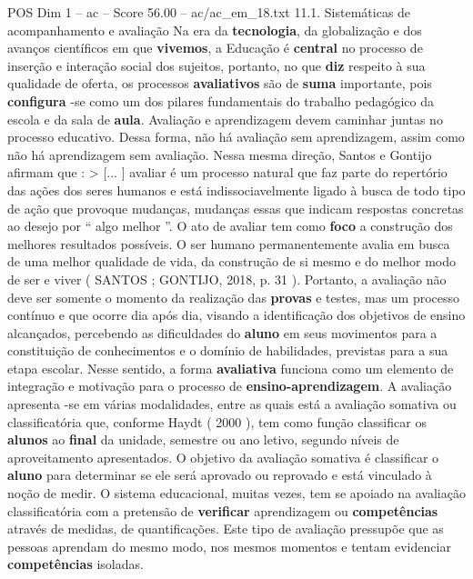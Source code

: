 \begin{textsample}{POS Dim 1 – ac – Score 56.00 – ac/ac\_em\_18.txt}  \label{ex:f1_pos_171}
11.1.
Sistemáticas de acompanhamento e avaliação Na era da \textbf{tecnologia}, da globalização e dos avanços científicos em que \textbf{vivemos}, a Educação é \textbf{central} no processo de inserção e interação social dos sujeitos, portanto, no que \textbf{diz} respeito à sua qualidade de oferta, os processos \textbf{avaliativos} são de \textbf{suma} importante, pois \textbf{configura} -se como um dos pilares fundamentais do trabalho pedagógico da escola e da sala de \textbf{aula}.
Avaliação e aprendizagem devem caminhar juntas no processo educativo.
Dessa forma, não há avaliação sem aprendizagem, assim como não há aprendizagem sem avaliação.
Nessa mesma direção, Santos e Gontijo afirmam que : > [... ] avaliar é um processo natural que faz parte do repertório das ações dos seres humanos e está indissociavelmente ligado à busca de todo tipo de ação que provoque mudanças, mudanças essas que indicam respostas concretas ao desejo por “ algo melhor ”.
O ato de avaliar tem como \textbf{foco} a construção dos melhores resultados possíveis.
O ser humano permanentemente avalia em busca de uma melhor qualidade de vida, da construção de si mesmo e do melhor modo de ser e viver ( SANTOS ; GONTIJO, 2018, p. 31 ).
Portanto, a avaliação não deve ser somente o momento da realização das \textbf{provas} e testes, mas um processo contínuo e que ocorre dia após dia, visando a identificação dos objetivos de ensino alcançados, percebendo as dificuldades do \textbf{aluno} em seus movimentos para a constituição de conhecimentos e o domínio de habilidades, previstas para a sua etapa escolar.
Nesse sentido, a forma \textbf{avaliativa} funciona como um elemento de integração e motivação para o processo de \textbf{ensino-aprendizagem}.
A avaliação apresenta -se em várias modalidades, entre as quais está a avaliação somativa ou classificatória que, conforme Haydt ( 2000 ), tem como função classificar os \textbf{alunos} ao \textbf{final} da unidade, semestre ou ano letivo, segundo níveis de aproveitamento apresentados.
O objetivo da avaliação somativa é classificar o \textbf{aluno} para determinar se ele será aprovado ou reprovado e está vinculado à noção de medir.
O sistema educacional, muitas vezes, tem se apoiado na avaliação classificatória com a pretensão de \textbf{verificar} aprendizagem ou \textbf{competências} através de medidas, de quantificações.
Este tipo de avaliação pressupõe que as pessoas aprendam do mesmo modo, nos mesmos momentos e tentam evidenciar \textbf{competências} isoladas.

\end{textsample}
